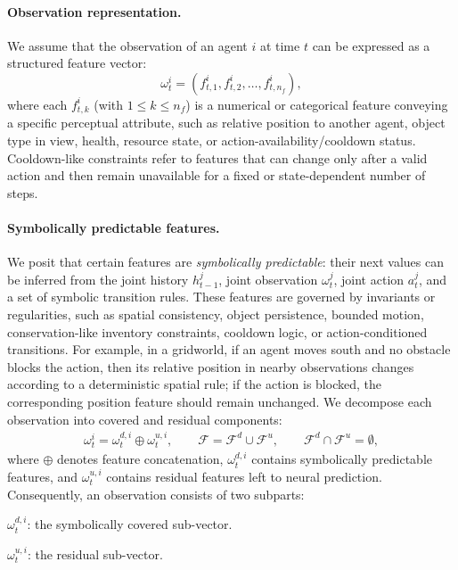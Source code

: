 \documentclass{article}
\theoremstyle{plain}
\theoremstyle{definition}
\theoremstyle{remark}
\begin{document}
\paragraph{Observation representation.} We assume that the observation of an agent $i$ at time $t$ can be expressed as a structured feature vector:
\begin{equation}
  \omega^i_t = (f^i_{t,1}, f^i_{t,2}, \dots, f^i_{t,n_f}),
  \label{eq:structured_observation}
\end{equation}
where each $f^i_{t,k}$ (with $1 \leq k \leq n_f$) is a numerical or categorical feature conveying a specific perceptual attribute, such as relative position to another agent, object type in view, health, resource state, or action-availability/cooldown status. Cooldown-like constraints refer to features that can change only after a valid action and then remain unavailable for a fixed or state-dependent number of steps.

\paragraph{Symbolically predictable features.} We posit that certain features are \emph{symbolically predictable}: their next values can be inferred from the joint history $h^j_{t-1}$, joint observation $\omega^j_t$, joint action $a^j_t$, and a set of symbolic transition rules. These features are governed by invariants or regularities, such as spatial consistency, object persistence, bounded motion, conservation-like inventory constraints, cooldown logic, or action-conditioned transitions. For example, in a gridworld, if an agent moves south and no obstacle blocks the action, then its relative position in nearby observations changes according to a deterministic spatial rule; if the action is blocked, the corresponding position feature should remain unchanged. We decompose each observation into covered and residual components:
%
\begin{equation}
  \begin{aligned}
    \omega^i_t
    =
    \omega^{d,i}_t \oplus \omega^{u,i}_t,
    \qquad
    \mathcal{F} = \mathcal{F}^d \cup \mathcal{F}^u,
    \qquad
    \mathcal{F}^d \cap \mathcal{F}^u = \emptyset ,
  \end{aligned}
  \label{eq:covered_residual_decomposition}
\end{equation}
%
where $\oplus$ denotes feature concatenation, $\omega^{d,i}_t$ contains symbolically predictable features, and $\omega^{u,i}_t$ contains residual features left to neural prediction. Consequently, an observation consists of two subparts:
\begin{enumerate*}[label={\roman*) },itemjoin={; \quad}]
  \item $\omega^{d,i}_t$: the symbolically covered sub-vector.
  \item $\omega^{u,i}_t$: the residual sub-vector.
\end{enumerate*}
\end{document}
